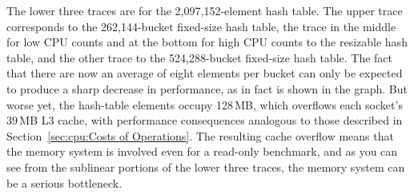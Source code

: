 The lower three traces are for the 2,097,152-element hash table.
The upper trace corresponds to the 262,144-bucket fixed-size hash table,
the trace in the middle for low CPU counts and at the bottom for high
CPU counts to the resizable hash table, and the other trace
to the 524,288-bucket fixed-size hash table.
The fact that there are now an average of eight elements per bucket
can only be expected to produce a sharp decrease in performance,
as in fact is shown in the graph.
But worse yet, the hash-table elements occupy 128\,MB, which overflows
each socket's 39\,MB L3 cache, with performance consequences analogous
to those described in Section~\ref{sec:cpu:Costs of Operations}.
The resulting cache overflow means that the memory system is involved
even for a read-only benchmark, and as you can see from the sublinear
portions of the lower three traces, the memory system can be a serious
bottleneck.

